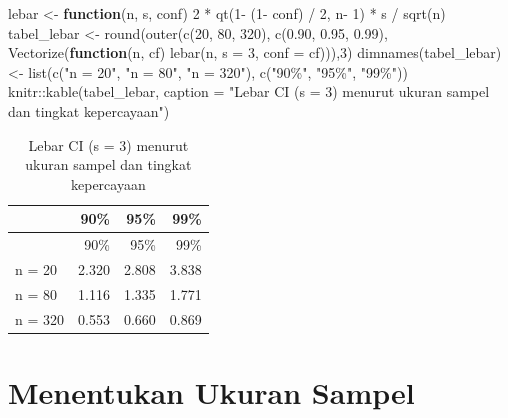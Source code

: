 \documentclass[
  indonesian,
  letterpaper,
]{book}
\newenvironment{Shaded}{\begin{snugshade}}{\end{snugshade}}
\newcommand{\AttributeTok}[1]{\textcolor[rgb]{0.40,0.45,0.13}{#1}}
\newcommand{\ControlFlowTok}[1]{\textcolor[rgb]{0.00,0.23,0.31}{\textbf{#1}}}
\newcommand{\DecValTok}[1]{\textcolor[rgb]{0.68,0.00,0.00}{#1}}
\newcommand{\FloatTok}[1]{\textcolor[rgb]{0.68,0.00,0.00}{#1}}
\newcommand{\FunctionTok}[1]{\textcolor[rgb]{0.28,0.35,0.67}{#1}}
\newcommand{\NormalTok}[1]{\textcolor[rgb]{0.00,0.23,0.31}{#1}}
\newcommand{\OtherTok}[1]{\textcolor[rgb]{0.00,0.23,0.31}{#1}}
\newcommand{\SpecialCharTok}[1]{\textcolor[rgb]{0.37,0.37,0.37}{#1}}
\newcommand{\StringTok}[1]{\textcolor[rgb]{0.13,0.47,0.30}{#1}}
\begin{document}
\begin{Shaded}
\begin{Highlighting}[]
\NormalTok{lebar }\OtherTok{\textless{}{-}} \ControlFlowTok{function}\NormalTok{(n, s, conf) }\DecValTok{2} \SpecialCharTok{*} \FunctionTok{qt}\NormalTok{(}\DecValTok{1}\SpecialCharTok{{-}}\NormalTok{ (}\DecValTok{1}\SpecialCharTok{{-}}\NormalTok{ conf) }\SpecialCharTok{/} \DecValTok{2}\NormalTok{, n}\SpecialCharTok{{-}} \DecValTok{1}\NormalTok{) }\SpecialCharTok{*}\NormalTok{ s }\SpecialCharTok{/} \FunctionTok{sqrt}\NormalTok{(n)}
\NormalTok{tabel\_lebar }\OtherTok{\textless{}{-}} \FunctionTok{round}\NormalTok{(}\FunctionTok{outer}\NormalTok{(}\FunctionTok{c}\NormalTok{(}\DecValTok{20}\NormalTok{, }\DecValTok{80}\NormalTok{, }\DecValTok{320}\NormalTok{), }\FunctionTok{c}\NormalTok{(}\FloatTok{0.90}\NormalTok{, }\FloatTok{0.95}\NormalTok{, }\FloatTok{0.99}\NormalTok{),}
\FunctionTok{Vectorize}\NormalTok{(}\ControlFlowTok{function}\NormalTok{(n, cf) }\FunctionTok{lebar}\NormalTok{(n, }\AttributeTok{s =} \DecValTok{3}\NormalTok{, }\AttributeTok{conf =}\NormalTok{ cf))),}\DecValTok{3}\NormalTok{)}
\FunctionTok{dimnames}\NormalTok{(tabel\_lebar) }\OtherTok{\textless{}{-}} \FunctionTok{list}\NormalTok{(}\FunctionTok{c}\NormalTok{(}\StringTok{"n = 20"}\NormalTok{, }\StringTok{"n = 80"}\NormalTok{, }\StringTok{"n = 320"}\NormalTok{), }\FunctionTok{c}\NormalTok{(}\StringTok{"90\%"}\NormalTok{, }\StringTok{"95\%"}\NormalTok{,}
\StringTok{"99\%"}\NormalTok{))}
\NormalTok{knitr}\SpecialCharTok{::}\FunctionTok{kable}\NormalTok{(tabel\_lebar, }\AttributeTok{caption =} \StringTok{"Lebar CI (s = 3) menurut ukuran sampel dan tingkat}
\StringTok{kepercayaan"}\NormalTok{)}
\end{Highlighting}
\end{Shaded}

\begin{longtable}[]{@{}lrrr@{}}
\caption{Lebar CI (s = 3) menurut ukuran sampel dan tingkat
kepercayaan}\tabularnewline
\toprule\noalign{}
& 90\% & 95\% & 99\% \\
\midrule\noalign{}
\endfirsthead
\toprule\noalign{}
& 90\% & 95\% & 99\% \\
\midrule\noalign{}
\endhead
\bottomrule\noalign{}
\endlastfoot
n = 20 & 2.320 & 2.808 & 3.838 \\
n = 80 & 1.116 & 1.335 & 1.771 \\
n = 320 & 0.553 & 0.660 & 0.869 \\
\end{longtable}

\section{Menentukan Ukuran Sampel}\label{menentukan-ukuran-sampel}
\end{document}
